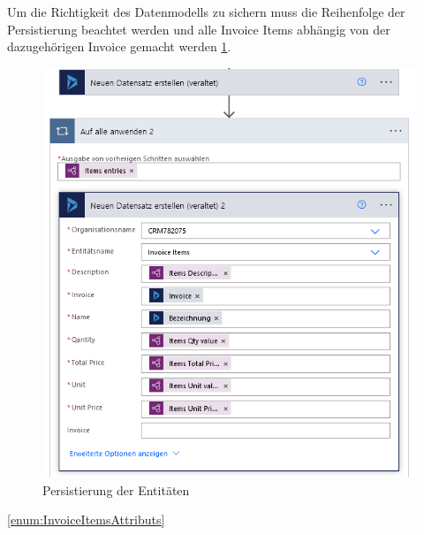 Um die Richtigkeit des Datenmodells zu sichern muss die Reihenfolge der Persistierung beachtet werden und alle Invoice Items abhängig von der dazugehörigen Invoice gemacht werden \ref{fig:persistence-entities}.

\begin{figure}[h]
    \centering
    \includegraphics[scale=0.4]{sections/cloud-computing/images/power-automate-flow/insert2-dynamics-crm.png}
    \caption{Persistierung der Entitäten}
    \label{fig:persistence-entities}
\end{figure}

\ref{enum:InvoiceItemsAttributs}